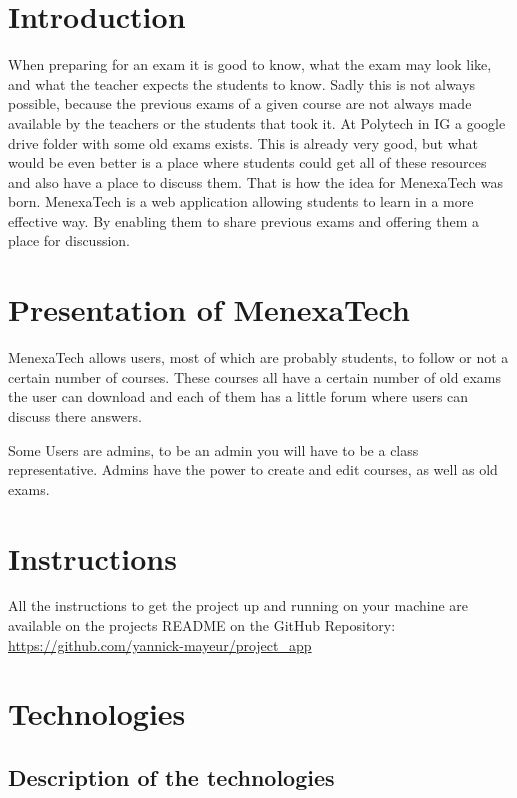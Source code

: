 \documentclass[12pt,a4paper]{article}
\begin{document}

\tableofcontents
\break


\section{Introduction}

When preparing for an exam it is good to know, what the exam may look like, and
what the teacher expects the students to know. Sadly this is not always
possible, because the previous exams of a given course are not always made
available by the teachers or the students that took it. At Polytech in IG a
google drive folder with some old exams exists. This is already very good, but
what would be even better is a place where students could get all of these
resources and also have a place to discuss them. That is how the idea for
MenexaTech was born. MenexaTech is a web application allowing students to
learn in a more effective way. By enabling  them to share previous exams and
offering them a place for discussion.


\section{Presentation of MenexaTech}

MenexaTech allows users, most of which are probably students, to follow or not
a certain number of courses. These courses all have a certain number of old
exams the user can download and each of them has a little forum where users
can discuss there answers.

Some Users are admins, to be an admin you will have to be a class
representative. Admins have the power to create and edit courses, as well as
old exams.


\section{Instructions}

All the instructions to get the project up and running on your machine are
available on the projects README on the GitHub Repository: 
\url{https://github.com/yannick-mayeur/project_app}

\section{Technologies}

\subsection{Description of the technologies}
\end{document}
